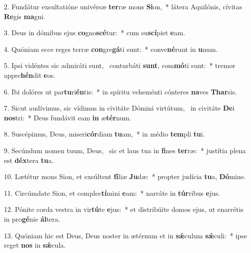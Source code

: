 2. Fundátur exsultatióne univérsæ \textbf{ter}ræ mons \textbf{Si}on,~*  látera Aquilónis, cívitas \textbf{Re}gis \textbf{ma}gni.\

3. Deus in dómibus ejus \textbf{co}gno\textbf{scé}tur:~*  cum su\textbf{scí}piet \textbf{e}am.\

4. Quóniam ecce reges terræ \textbf{con}gre\textbf{gá}ti sunt:~*  conve\textbf{né}runt in \textbf{u}num.\

5. Ipsi vidéntes sic admiráti sunt, \dag\  conturbáti \textbf{sunt}, com\textbf{mó}ti sunt:~*  tremor appre\textbf{hén}dit \textbf{e}os.\

6. Ibi dolóres ut par\textbf{tu}ri\textbf{én}tis:~*  in spíritu veheménti cónteres \textbf{na}ves \textbf{Thar}sis.\

7. Sicut audívimus, sic vídimus in civitáte Dómini virtútum, \dag\  in civitáte \textbf{De}i \textbf{nos}tri:~*  Deus fundávit eam \textbf{in} æ\textbf{tér}num.\

8. Suscépimus, Deus, miseri\textbf{cór}diam \textbf{tu}am,~*  in médio \textbf{tem}pli \textbf{tu}i.\

9. Secúndum nomen tuum, Deus, \dag\  sic et laus tua in \textbf{fi}nes \textbf{ter}ræ:~*  justítia plena est \textbf{déx}tera \textbf{tu}a.\

10. Lætétur mons Sion, et exsúltent \textbf{fí}liæ \textbf{Ju}dæ:~*  propter judícia \textbf{tu}a, \textbf{Dó}mine.\

11. Circúmdate Sion, et complec\textbf{tí}mini \textbf{e}am:~*  narráte in \textbf{túr}ribus \textbf{e}jus.\

12. Pónite corda vestra in vir\textbf{tú}te \textbf{e}jus:~*  et distribúite domos ejus, ut enarrétis in pro\textbf{gé}nie \textbf{ál}tera.\

13. Quóniam hic est Deus, Deus noster in ætérnum et in \textbf{sǽ}culum \textbf{sǽ}culi:~*  ipse reget \textbf{nos} in \textbf{sǽ}cula.\

